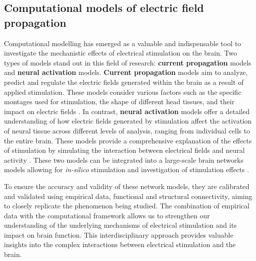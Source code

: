 \documentclass[../main.tex]{subfiles}
\begin{document}
\subsection{Computational models of electric field propagation}
Computational modelling has emerged as a valuable and indispensable tool to investigate the mechanistic effects of electrical stimulation on the brain.
Two types of models stand out in this field of research: \textbf{current propagation} models and \textbf{neural activation} models.
\textbf{Current propagation} models aim to analyze, predict and regulate the electric fields generated within the brain as a result of applied stimulation.
These models consider various factors such as the specific montages used for stimulation, the shape of different head tissues, and their impact on electric fields \citep{miranda2006modeling, holdefer2006predicted, russell2014gender,forssell2021effect, huang2017measurements}. 
In contrast, \textbf{neural activation} models offer a detailed understanding of how electric fields generated by stimulation affect the activation of neural tissue across different levels of analysis, ranging from individual cells to the entire brain. These models provide a comprehensive explanation of the effects of stimulation by simulating the interaction between electrical fields and neural activity \citep{merlet_oscillatory_2013, deco2019awakening, aberra2020simulation,  meier_virtual_2021, tran2022effects, wang2023responses}.
These two models can be integrated into a large-scale brain networks models allowing for \textit{in-silico} stimulation and investigation of stimulation effects \citep{merlet_oscillatory_2013}.

To ensure the accuracy and validity of these network models, they are calibrated and validated using empirical data, functional and structural connectivity, aiming to closely replicate the phenomenon being studied.
The combination of empirical data with the computational framework allows us to strengthen our understanding of the underlying mechanisms of electrical stimulation and its impact on brain function.
This interdisciplinary approach provides valuable insights into the complex interactions between electrical stimulation and the brain.
\end{document}
